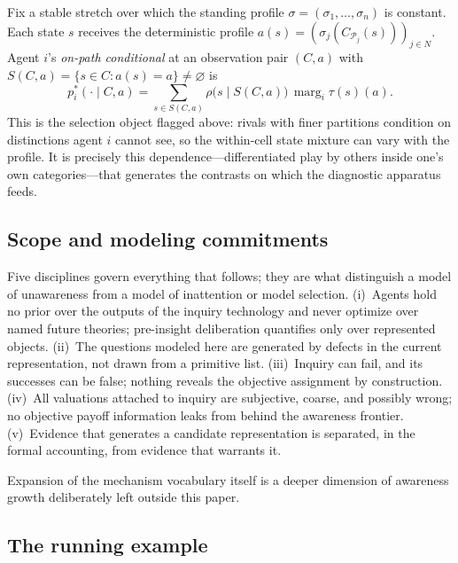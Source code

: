 \documentclass[11pt]{article}
\theoremstyle{definition}
\newcommand{\emptysetset}{\varnothing}
\newcommand{\marg}[1]{\operatorname{marg}_{#1}}
\begin{document}
Fix a stable stretch over which the standing profile $\sigma=(\sigma_1,\dots,\sigma_n)$ is constant.
Each state $s$ receives the deterministic profile $a(s)=(\sigma_j(C_{\mathcal P_j}(s)))_{j\in N}$.
Agent $i$'s \emph{on-path conditional} at an observation pair $(C,a)$ with $S(C,a)=\{s\in C:a(s)=a\}\neq\emptysetset$ is
\begin{equation}
p_i^{*}(\cdot\mid C,a)
=
\sum_{s\in S(C,a)}\rho\bigl(s\mid S(C,a)\bigr)\,\marg{i}\tau(s)(a).
\label{eq:onpath-conditional}
\end{equation}
This is the selection object flagged above: rivals with finer partitions condition on distinctions agent $i$ cannot see, so the within-cell state mixture can vary with the profile.
It is precisely this dependence---differentiated play by others inside one's own categories---that generates the contrasts on which the diagnostic apparatus feeds.

\subsection{Scope and modeling commitments}
\label{sec:commitments}

Five disciplines govern everything that follows; they are what distinguish a model of unawareness from a model of inattention or model selection.
(i)~Agents hold no prior over the outputs of the inquiry technology and never optimize over named future theories; pre-insight deliberation quantifies only over represented objects.
(ii)~The questions modeled here are generated by defects in the current representation, not drawn from a primitive list.
(iii)~Inquiry can fail, and its successes can be false; nothing reveals the objective assignment by construction.
(iv)~All valuations attached to inquiry are subjective, coarse, and possibly wrong; no objective payoff information leaks from behind the awareness frontier.
(v)~Evidence that generates a candidate representation is separated, in the formal accounting, from evidence that warrants it.

Expansion of the mechanism vocabulary itself is a deeper dimension of awareness growth deliberately left outside this paper.

\subsection{The running example}
\end{document}
